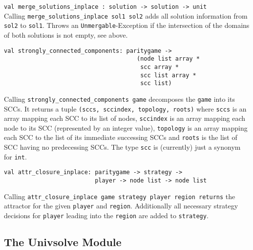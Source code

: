 \begin{description}
\item \verb+val merge_solutions_inplace : solution -> solution -> unit+ \ \\
Calling \verb+merge_solutions_inplace sol1 sol2+ adds all solution information from \verb+sol2+ to \verb+sol1+.
Throws an \verb+Unmergable+-Exception if the intersection of the domains of both solutions is not empty, see above.

\item
\begin{verbatim}
val strongly_connected_components: paritygame ->
                                      (node list array *
                                       scc array *
                                       scc list array *
                                       scc list)
\end{verbatim}
Calling \verb+strongly_connected_components game+ decomposes the \verb+game+ into its SCCs. It returns a tuple
\verb+(sccs, sccindex, topology, roots)+ where \verb+sccs+ is an array mapping each SCC to its list of nodes,
\verb+sccindex+ is an array mapping each node to its SCC (represented by an integer value), \verb+topology+ is an
array mapping each SCC to the list of its immediate successing SCCs and \verb+roots+ is the list of SCC having no
predecessing SCCs. The type \verb#scc# is (currently) just a synonym for \verb#int#. 

\item
\begin{verbatim}
val attr_closure_inplace: paritygame -> strategy ->
                          player -> node list -> node list
\end{verbatim}
Calling \verb+attr_closure_inplace game strategy player region returns+ the attractor for the given \verb+player+
and \verb+region+. Additionally all necessary strategy decisions for \verb+player+ leading into the \verb+region+
are added to \verb+strategy+.

\end{description}


\subsection{The {\ttfamily Univsolve} Module}

